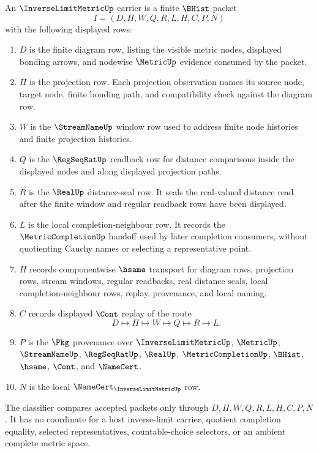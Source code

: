 \begin{definition}\label{def:inverse-limit-metric-carrier}
An $\InverseLimitMetricUp$ carrier is a finite $\BHist$ packet
$$
I=(D,\Pi,W,Q,R,L,H,C,P,N)
$$
with the following displayed rows:
\begin{enumerate}
\item $D$ is the finite diagram row, listing the visible metric nodes, displayed bonding arrows, and nodewise $\MetricUp$ evidence consumed by the packet.
\item $\Pi$ is the projection row. Each projection observation names its source node, target node, finite bonding path, and compatibility check against the diagram row.
\item $W$ is the $\StreamNameUp$ window row used to address finite node histories and finite projection histories.
\item $Q$ is the $\RegSeqRatUp$ readback row for distance comparisons inside the displayed nodes and along displayed projection paths.
\item $R$ is the $\RealUp$ distance-seal row. It seals the real-valued distance read after the finite window and regular readback rows have been displayed.
\item $L$ is the local completion-neighbour row. It records the $\MetricCompletionUp$ handoff used by later completion consumers, without quotienting Cauchy names or selecting a representative point.
\item $H$ records componentwise $\hsame$ transport for diagram rows, projection rows, stream windows, regular readbacks, real distance seals, local completion-neighbour rows, replay, provenance, and local naming.
\item $C$ records displayed $\Cont$ replay of the route
$$
D\longmapsto \Pi\longmapsto W\longmapsto Q\longmapsto R\longmapsto L .
$$
\item $P$ is the $\Pkg$ provenance over $\InverseLimitMetricUp$, $\MetricUp$, $\StreamNameUp$, $\RegSeqRatUp$, $\RealUp$, $\MetricCompletionUp$, $\BHist$, $\hsame$, $\Cont$, and $\NameCert$.
\item $N$ is the local $\NameCert_{\InverseLimitMetricUp}$ row.
\end{enumerate}
The classifier compares accepted packets only through $D,\Pi,W,Q,R,L,H,C,P,N$. It has no coordinate for a host inverse-limit carrier, quotient completion equality, selected representatives, countable-choice selectors, or an ambient complete metric space.
\end{definition}

